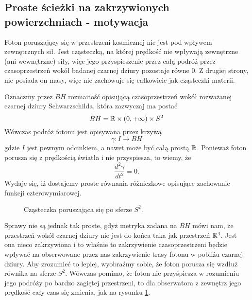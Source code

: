  \subsection{Proste ścieżki na zakrzywionych powierzchniach - motywacja}

Foton poruszający się w przestrzeni kosmicznej nie jest pod wpływem zewnętrznych sił. Jest cząsteczką, na której prędkość nie wpływają zewnętrzne (ani wewnętrzne) siły, więc jego przyspieszenie przez całą podróż przez czasoprzestrzeń wokół badanej czarnej dziury pozostaje równe $0$. Z drugiej strony, nie posiada on masy, więc nie zachowuje się całkowicie jak cząsteczki materii.

Oznaczmy przez $BH$ rozmaitość opisującą czasoprzestrzeń wokół rozważanej czarnej dziury Schwarzschilda, która zazwyczaj ma postać
$$ BH = \mathbb{R} \times (0,+\infty) \times S^2 $$
Wówczas podróż fotonu jest opisywana przez krzywą
$$ \gamma:I \to BH $$
gdzie $I$ jest pewnym odcinkiem, a nawet może być całą prostą $\mathbb{R}$. Ponieważ foton porusza się z prędkością światła i nie przyspiesza, to wiemy, że
$$\frac{d^2 \gamma} {d t^2}=0.$$ 
Wydaje się, iż dostajemy proste równania różniczkowe opisujące zachowanie funkcji czterowymiarowej.

\renewcommand{\figurename}{Rysunek}
\begin{figure}[h] 
  \centering 
  \vspace{1cm}
  \caption{Cząsteczka poruszająca się po sferze $S^2$.}\label{czasteczka po sferze}
  \vspace{1cm}
\end{figure}

Sprawy nie są jednak tak proste, gdyż metryka zadana na $BH$ mówi nam, że przestrzeń wokół czarnej dziury nie jest do końca taka jak przestrzeń $\mathbb{R}^4$. Jest ona nieco zakrzywiona i to właśnie to zakrzywienie czasoprzestrzeni będzie wpływać na obserwowane przez nas zakrzywienie trasy fotonu w pobliżu czarnej dziury. Aby zrozumieć to lepiej, wyobraźmy sobie, że foton porusza się wzdłuż równika na sferze $S^2$. Wówczas pomimo, że foton nie przyśpiesza w rozumieniu jego podróży po bardzo zagiętej przestrzeni, to dla obserwatora z zewnętrz jego prędkość cały czas się zmienia, jak na rysunku \ref{czasteczka po sferze}.


